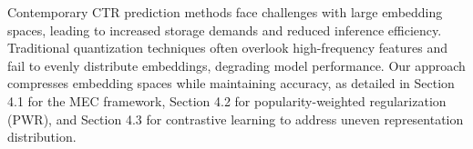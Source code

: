 












Contemporary CTR prediction methods face challenges with large embedding spaces, leading to increased storage demands and reduced inference efficiency. Traditional quantization techniques often overlook high-frequency features and fail to evenly distribute embeddings, degrading model performance. Our approach compresses embedding spaces while maintaining accuracy, as detailed in Section 4.1 for the MEC framework, Section 4.2 for popularity-weighted regularization (PWR), and Section 4.3 for contrastive learning to address uneven representation distribution.

